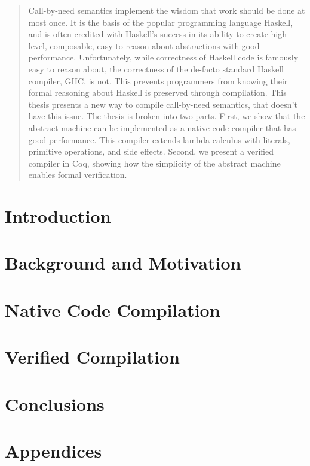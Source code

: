 \documentclass[botnum, fleqn]{unmeethesis}
\begin{document}
\begin{abstract}
Call-by-need semantics implement the wisdom that work should be done at most
once. It is the basis of the popular programming language Haskell, and is often
credited with Haskell's success in its ability to create high-level, composable,
easy to reason about abstractions with good performance. Unfortunately, while
correctness of Haskell code is famously easy to reason about, the correctness of
the de-facto standard Haskell compiler, GHC, is not. This prevents programmers
from knowing their formal reasoning about Haskell is preserved through
compilation. This thesis presents a new way to compile call-by-need semantics,
that doesn't have this issue. The thesis is broken into two parts. First, we
show that the abstract machine can be implemented as a native code compiler that
has good performance. This compiler extends lambda calculus with literals,
primitive operations, and side effects. Second, we present a verified compiler
in Coq, showing how the simplicity of the abstract machine enables formal
verification. 
\clearpage %
\end{abstract}

\tableofcontents
\listoffigures

\mainmatter

\chapter{Introduction}


\chapter{Background and Motivation}


\chapter{Native Code Compilation}\label{chap:cem}









\chapter{Verified Compilation}\label{chap:verified}









\chapter{Conclusions}


\chapter*{Appendices}

\appendix





\end{document}
